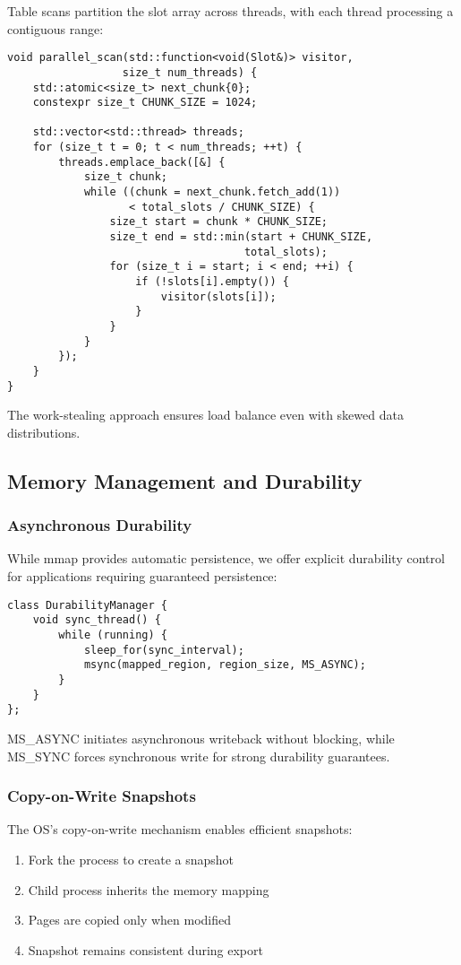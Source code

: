 \documentclass[11pt]{article}
\begin{document}
Table scans partition the slot array across threads, with each thread processing a contiguous range:

\begin{lstlisting}[caption={Parallel scan with work stealing},label={lst:parallel-scan}]
void parallel_scan(std::function<void(Slot&)> visitor,
                  size_t num_threads) {
    std::atomic<size_t> next_chunk{0};
    constexpr size_t CHUNK_SIZE = 1024;
    
    std::vector<std::thread> threads;
    for (size_t t = 0; t < num_threads; ++t) {
        threads.emplace_back([&] {
            size_t chunk;
            while ((chunk = next_chunk.fetch_add(1)) 
                   < total_slots / CHUNK_SIZE) {
                size_t start = chunk * CHUNK_SIZE;
                size_t end = std::min(start + CHUNK_SIZE,
                                     total_slots);
                for (size_t i = start; i < end; ++i) {
                    if (!slots[i].empty()) {
                        visitor(slots[i]);
                    }
                }
            }
        });
    }
}
\end{lstlisting}

The work-stealing approach ensures load balance even with skewed data distributions.

\subsection{Memory Management and Durability}

\subsubsection{Asynchronous Durability}
While mmap provides automatic persistence, we offer explicit durability control for applications requiring guaranteed persistence:

\begin{lstlisting}[caption={Durability manager implementation},label={lst:durability}]
class DurabilityManager {
    void sync_thread() {
        while (running) {
            sleep_for(sync_interval);
            msync(mapped_region, region_size, MS_ASYNC);
        }
    }
};
\end{lstlisting}

MS\_ASYNC initiates asynchronous writeback without blocking, while MS\_SYNC forces synchronous write for strong durability guarantees.

\subsubsection{Copy-on-Write Snapshots}
The OS's copy-on-write mechanism enables efficient snapshots:
\begin{enumerate}
\item Fork the process to create a snapshot
\item Child process inherits the memory mapping
\item Pages are copied only when modified
\item Snapshot remains consistent during export
\end{enumerate}
\end{document}
